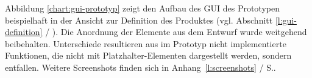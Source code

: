 \setlength\fboxsep{2pt}
\setlength\fboxrule{0.5pt}

\begin{center}
\label{chart:gui-prototyp}
\end{center}

Abbildung \ref{chart:gui-prototyp} zeigt den Aufbau des GUI des Prototypen beispielhaft in der Ansicht zur Definition des Produktes (vgl. Abschnitt \ref{l:gui-definition} / \pageref{l:gui-definition}). Die Anordnung der Elemente aus dem Entwurf wurde weitgehend beibehalten. Unterschiede resultieren aus im Prototyp nicht implementierte Funktionen, die nicht mit Platzhalter-Elementen dargestellt werden, sondern entfallen. Weitere Screenshots finden sich in Anhang~\ref{l:screenshots} / S.\pageref{l:screenshots}.